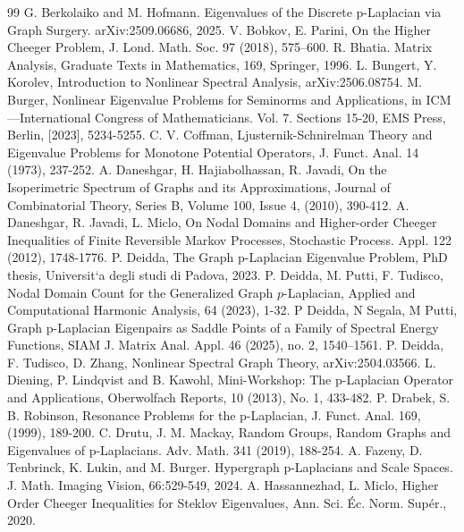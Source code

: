 \documentclass[12pt, reqno]{article}
\begin{document}
\begin{thebibliography}{99}
 G. Berkolaiko and M. Hofmann. Eigenvalues of the Discrete p-Laplacian via Graph Surgery. arXiv:2509.06686, 2025.
 V. Bobkov, E. Parini, On the Higher Cheeger Problem, J. Lond. Math. Soc. 97 (2018), 575--600.
 R. Bhatia. Matrix Analysis, Graduate Texts in Mathematics, 169, Springer, 1996.
 L. Bungert, Y. Korolev, Introduction to Nonlinear Spectral Analysis, arXiv:2506.08754.
 M. Burger, Nonlinear Eigenvalue Problems for Seminorms and Applications, in ICM—International Congress of Mathematicians. Vol. 7. Sections 15-20, EMS Press, Berlin, [2023], 5234-5255.
 C. V. Coffman, Ljusternik-Schnirelman Theory and Eigenvalue Problems for Monotone Potential Operators, J. Funct. Anal. 14 (1973), 237-252.
 A. Daneshgar, H. Hajiabolhassan, R. Javadi, On the Isoperimetric Spectrum of Graphs and its Approximations, Journal of Combinatorial Theory, Series B, Volume 100, Issue 4, (2010), 390-412.
 A. Daneshgar, R. Javadi, L. Miclo, On Nodal Domains and Higher-order Cheeger Inequalities of Finite Reversible Markov Processes, Stochastic Process. Appl. 122 (2012),  1748-1776.
 P. Deidda, The Graph p-Laplacian Eigenvalue Problem, PhD thesis, Universit`a degli studi di Padova, 2023.
  P. Deidda, M. Putti, F. Tudisco, Nodal Domain Count for the Generalized Graph $p$-Laplacian, Applied and Computational Harmonic Analysis, 64 (2023), 1-32.
 P Deidda, N Segala, M Putti, Graph p-Laplacian Eigenpairs as Saddle Points of a Family of Spectral Energy Functions, SIAM J. Matrix Anal. Appl. 46 (2025), no. 2, 1540--1561.
 P. Deidda, F. Tudisco, D. Zhang, Nonlinear Spectral Graph Theory, arXiv:2504.03566.
 L. Diening, P. Lindqvist and B. Kawohl, Mini-Workshop: The p-Laplacian Operator and Applications, Oberwolfach Reports, 10 (2013), No. 1, 433-482.
 P. Drabek, S. B. Robinson, Resonance Problems for the p-Laplacian, J. Funct. Anal. 169, (1999), 189-200.
 C. Drutu, J. M. Mackay, Random Groups, Random Graphs and Eigenvalues of p-Laplacians. Adv. Math. 341 (2019), 188-254.
 A. Fazeny, D. Tenbrinck, K. Lukin, and M. Burger. Hypergraph p-Laplacians and Scale Spaces. J. Math. Imaging Vision, 66:529-549, 2024.
 A. Hassannezhad,  L. Miclo, Higher Order Cheeger Inequalities for Steklov Eigenvalues, Ann. Sci. Éc. Norm. Supér., 2020.

\end{thebibliography}
\end{document}
